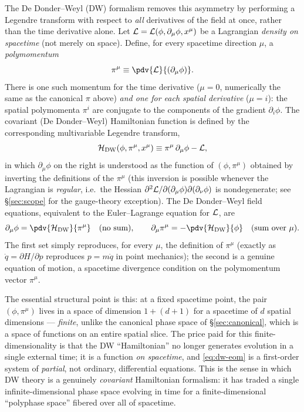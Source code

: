 The De Donder--Weyl (DW) formalism removes this asymmetry by performing a
Legendre transform with respect to \emph{all} derivatives of the field at once,
rather than the time derivative alone. Let
$\mathcal{L}=\mathcal{L}(\phi,\partial_\mu\phi,x^\mu)$ be a Lagrangian \emph{density on
spacetime} (not merely on space). Define, for every spacetime direction $\mu$,
a \emph{polymomentum}
\begin{equation}
\pi^\mu \equiv \pdv{\Lag}{(\partial_\mu\phi)}.
\end{equation}
There is one such momentum for the time derivative ($\mu=0$, numerically the
same as the canonical $\pi$ above) \emph{and one for each spatial derivative}
($\mu=i$): the spatial polymomenta $\pi^i$ are conjugate to the components of
the gradient $\partial_i\phi$. The covariant (De Donder--Weyl) Hamiltonian
function is defined by the corresponding multivariable Legendre transform,
\begin{equation}
\mathcal{H}_{\mathrm{DW}}(\phi,\pi^\mu,x^\mu) \equiv \pi^\mu\,\partial_\mu\phi - \mathcal{L} ,
\label{eq:dw-hamiltonian}
\end{equation}
in which $\partial_\mu\phi$ on the right is understood as the function of
$(\phi,\pi^\mu)$ obtained by inverting the definitions of the $\pi^\mu$ (this
inversion is possible whenever the Lagrangian is \emph{regular}, i.e.\ the
Hessian $\partial^2\mathcal{L}/\partial(\partial_\mu\phi)\partial(\partial_\nu\phi)$
is nondegenerate; see \S\ref{sec:scope} for the gauge-theory exception). The De
Donder--Weyl field equations, equivalent to the Euler--Lagrange equation for
$\mathcal{L}$, are
\begin{equation}
\partial_\mu\phi = \pdv{\Ham_{\mathrm{DW}}}{\pi^\mu} \quad(\text{no sum}), \qquad
\partial_\mu\pi^\mu = -\pdv{\Ham_{\mathrm{DW}}}{\phi} \quad(\text{sum over }\mu).
\label{eq:dw-eom}
\end{equation}
The first set simply reproduces, for every $\mu$, the definition of $\pi^\mu$
(exactly as $\dot q=\partial H/\partial p$ reproduces $p=m\dot q$ in point
mechanics); the second is a genuine equation of motion, a spacetime divergence
condition on the polymomentum vector $\pi^\mu$.

The essential structural point is this: at a fixed spacetime point, the pair
$(\phi,\pi^\mu)$ lives in a space of dimension $1+(d+1)$ for a spacetime of $d$
spatial dimensions --- \emph{finite}, unlike the canonical phase space of
\S\ref{sec:canonical}, which is a space of functions on an entire spatial
slice. The price paid for this finite-dimensionality is that the DW
``Hamiltonian'' no longer generates evolution in a single external time; it is
a function \emph{on spacetime}, and \eqref{eq:dw-eom} is a first-order system
of \emph{partial}, not ordinary, differential equations. This is the sense in
which DW theory is a genuinely \emph{covariant} Hamiltonian formalism: it has
traded a single infinite-dimensional phase space evolving in time for a
finite-dimensional ``polyphase space'' fibered over all of spacetime.

